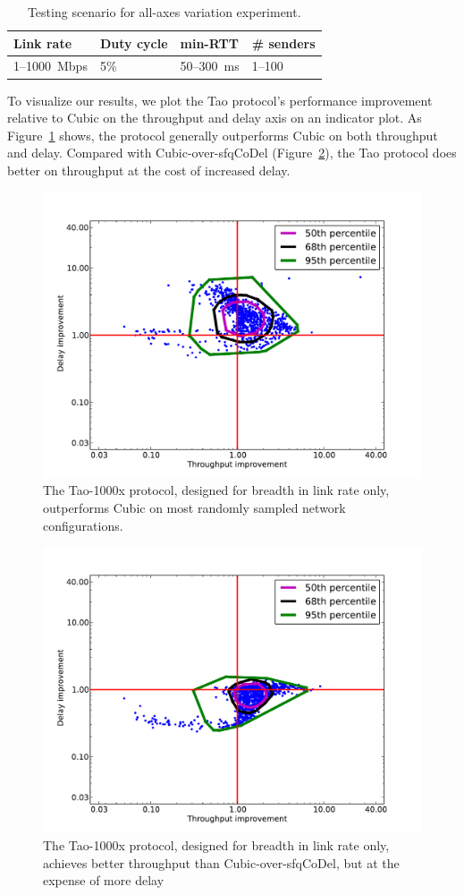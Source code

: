 \begin{table}
\centering
\begin{tabular}{l|l|l|l}
\bf Link rate & \bf Duty cycle & \bf min-RTT & \bf \# senders \\
\hline
1--1000~Mbps & 5\--100\% & 50--300~ms & 1--100 \\
\end{tabular}
\caption{Testing scenario for all-axes variation experiment.}
\label{table:random-sampling}
\end{table}

To visualize our results, we plot the Tao protocol's performance
improvement relative to Cubic on the throughput and delay axis on an
indicator plot. As Figure~\ref{fig:random-cubic} shows, the protocol
generally outperforms Cubic on both throughput and delay. Compared
with Cubic-over-sfqCoDel (Figure~\ref{fig:random-cubicsfqCoDel}), the
Tao protocol does better on throughput at the cost of increased delay.

\begin{figure}
\includegraphics[width=\columnwidth]{cubic-10-empirical.pdf}
\caption{The Tao-1000x protocol, designed for breadth in link rate only,
  outperforms Cubic on most randomly sampled network configurations.}
\label{fig:random-cubic}
\end{figure}

\begin{figure}
\includegraphics[width=\columnwidth]{cubicsfqCoDel-10-empirical.pdf}
\caption{The Tao-1000x protocol, designed for breadth in link rate only,
  achieves better throughput than Cubic-over-sfqCoDel, but at the
  expense of more delay}
\label{fig:random-cubicsfqCoDel}
\end{figure}
